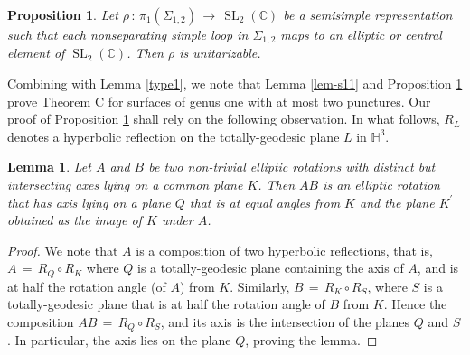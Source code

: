 \documentclass[reqno]{amsart}
\theoremstyle{plain}
\newtheorem{lemma}[theorem]{Lemma}
\newtheorem{proposition}[theorem]{Proposition}
\theoremstyle{definition}
\theoremstyle{remark}
\newcommand{\C}{{\mathbb{C}}}
\renewcommand{\H}{{\mathbb{H}}}
\DeclareMathOperator{\SL}{SL}
\begin{document}
\begin{proposition}\label{prop-s12}
Let $\rho\,:\, \pi_1(\Sigma_{1,2}) \,\to\, \SL_2(\C)$ be a semisimple representation such that each nonseparating
simple loop in $\Sigma_{1,2}$ maps to an elliptic or central element of $\SL_2(\C)$.
Then $\rho$ is unitarizable.
\end{proposition}

Combining with Lemma \ref{type1}, we note that Lemma \ref{lem-s11} and Proposition \ref{prop-s12} prove Theorem 
C for surfaces of genus one with at most two punctures. Our proof of Proposition \ref{prop-s12} shall rely on 
the following observation. In what follows, $R_L$ denotes a hyperbolic reflection on the totally-geodesic plane 
$L$ in $\H^3$.

\begin{lemma}\label{lem-plane}
Let $A$ and $B$ be two non-trivial elliptic rotations with distinct but intersecting axes lying on a common 
plane $K$.  Then $AB$ is an elliptic rotation that has axis lying on a plane $Q$ that is at equal angles from 
$K$ and the plane $K^\prime$ obtained as the image of $K$ under $A$.
\end{lemma}

\begin{proof}
We note that $A$ is a composition of two hyperbolic reflections, that is,$ A \,=\, R_Q \circ R_K$ where $Q$ is a 
totally-geodesic plane containing the axis of $A$, and is at half the rotation angle (of $A$) from $K$. 
Similarly, $B\, =\, R_K \circ R_S$, where $S$ is a totally-geodesic plane that is at half the rotation angle of $B$ 
from $K$. Hence the composition $AB \,=\, R_Q \circ R_S$, and its axis is the intersection of the planes $Q$ and 
$S$. In particular, the axis lies on the plane $Q$, proving the lemma.
\end{proof}
\end{document}

